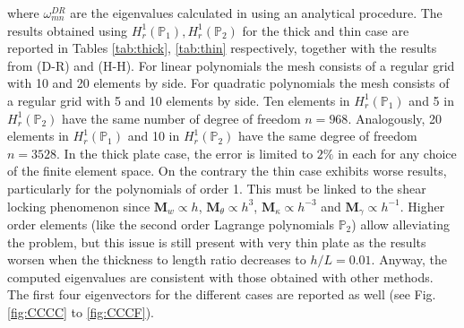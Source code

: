 \documentclass[11pt]{article}
\begin{document}
{		where $\omega_{mn}^{DR}$ are the eigenvalues calculated in \cite{dawe1980rayleigh} using an analytical procedure. The results obtained using $H_r^1(\mathbb{P}_1), H_r^1(\mathbb{P}_2)$ for the thick and thin case are reported in Tables \ref{tab:thick}, \ref{tab:thin} respectively, together with the results from \cite{dawe1980rayleigh} (D-R) and \cite{huang1984nine} (H-H). For linear polynomials the mesh consists of a regular grid with 10 and 20 elements by side. For quadratic polynomials the mesh consists of a regular grid with 5 and 10 elements by side. Ten elements in $H_r^1(\mathbb{P}_1)$ and 5 in $H_r^1(\mathbb{P}_2)$ have the same number of degree of freedom $n=968$. Analogously, 20 elements in $H_r^1(\mathbb{P}_1)$ and 10 in $H_r^1(\mathbb{P}_2)$ have the same degree of freedom $n=3528$.  In the thick plate case,  the error is limited to $2\%$ in each for any choice of the finite element space.  On the contrary the thin case exhibits worse results, particularly for the polynomials of order 1. This must be linked to the shear locking phenomenon since $\bm{M}_{w} \propto h$, $\bm{M}_{\theta} \propto h^3$, $\bm{M}_{\kappa} \propto h^{-3}$ and $\bm{M}_{\gamma} \propto h^{-1}$. Higher order elements (like the second order Lagrange polynomials $\mathbb{P}_2$) allow alleviating the problem, but this issue is still present with very thin plate as the results worsen when the thickness to length ratio decreases to $h/L = 0.01$. Anyway, the computed eigenvalues are consistent with those obtained with other methods. The first four eigenvectors for the different cases are reported as well (see Fig. \ref{fig:CCCC} to \ref{fig:CCCF}).
	}
	
\end{document}
